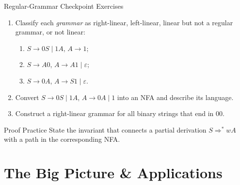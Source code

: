 \documentclass[10pt]{beamer}
\begin{document}
\begin{frame}{Regular-Grammar Checkpoint Exercises}
  \small
  \begin{enumerate}
    \item Classify each \emph{grammar} as right-linear, left-linear, linear
      but not a regular grammar, or not linear:
      \begin{enumerate}
        \item $S\rightarrow 0S\mid 1A$, $A\rightarrow 1$;
        \item $S\rightarrow A0$, $A\rightarrow A1\mid\varepsilon$;
        \item $S\rightarrow 0A$, $A\rightarrow S1\mid\varepsilon$.
      \end{enumerate}
    \item Convert $S\rightarrow 0S\mid 1A$, $A\rightarrow 0A\mid 1$
      into an NFA and describe its language.
    \item Construct a right-linear grammar for all binary strings that end in
      $00$.
  \end{enumerate}
  \pause
  \begin{alertblock}{Proof Practice}
    State the invariant that connects a partial derivation $S\Rightarrow^*wA$
    with a path in the corresponding NFA.
  \end{alertblock}
\end{frame}

\section{The Big Picture \& Applications}
\end{document}
